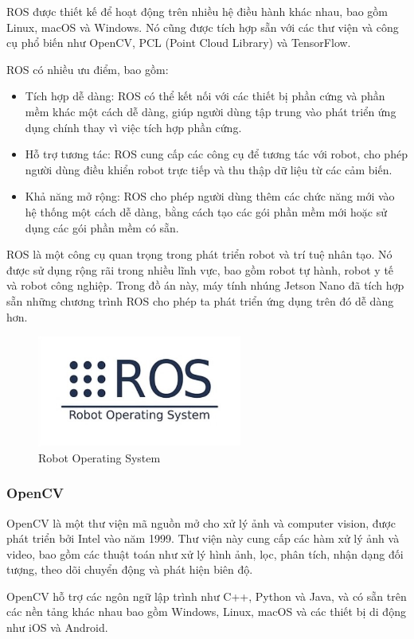 ROS được thiết kế để hoạt động trên nhiều hệ điều hành khác nhau, bao gồm Linux, macOS và Windows. Nó cũng được tích hợp sẵn với các thư viện và công cụ phổ biến như OpenCV, PCL (Point Cloud Library) và TensorFlow.

ROS có nhiều ưu điểm, bao gồm:
\begin{itemize}
    \item Tích hợp dễ dàng: ROS có thể kết nối với các thiết bị phần cứng và phần mềm khác một cách dễ dàng, giúp người dùng tập trung vào phát triển ứng dụng chính thay vì việc tích hợp phần cứng.
    \item Hỗ trợ tương tác: ROS cung cấp các công cụ để tương tác với robot, cho phép người dùng điều khiển robot trực tiếp và thu thập dữ liệu từ các cảm biến.
    \item Khả năng mở rộng: ROS cho phép người dùng thêm các chức năng mới vào hệ thống một cách dễ dàng, bằng cách tạo các gói phần mềm mới hoặc sử dụng các gói phần mềm có sẵn.
\end{itemize}
ROS là một công cụ quan trọng trong phát triển robot và trí tuệ nhân tạo. Nó được sử dụng rộng rãi trong nhiều lĩnh vực, bao gồm robot tự hành, robot y tế và robot công nghiệp. Trong đồ án này, máy tính nhúng Jetson Nano đã tích hợp sẵn những chương trình ROS cho phép ta phát triển ứng dụng trên đó dễ dàng hơn.
\begin{figure}[!h]
    \centering
    \includegraphics[width=0.6\textwidth]{Images/Implementation/Control/Ros.jpg}
    \caption{Robot Operating System}
\end{figure}
\subsubsection{OpenCV}
OpenCV là một thư viện mã nguồn mở cho xử lý ảnh và computer vision, được phát triển bởi Intel vào năm 1999. Thư viện này cung cấp các hàm xử lý ảnh và video, bao gồm các thuật toán như xử lý hình ảnh, lọc, phân tích, nhận dạng đối tượng, theo dõi chuyển động và phát hiện biên độ.

OpenCV hỗ trợ các ngôn ngữ lập trình như C++, Python và Java, và có sẵn trên các nền tảng khác nhau bao gồm Windows, Linux, macOS và các thiết bị di động như iOS và Android.

